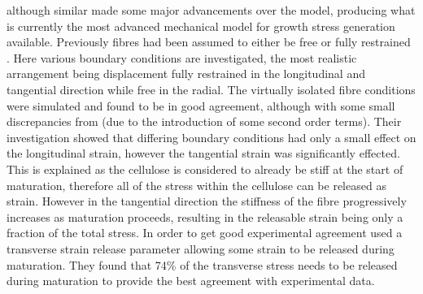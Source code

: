 \citet{Alm_ras_2005}
although similar made some major advancements over the \citet{Yamamoto_1998} model,
producing what is currently the most advanced mechanical model for growth
stress generation available. Previously fibres had been assumed to either be
free \citep{Yamamoto_1998} or fully restrained \citep{archer1987,archer1989}. Here
various boundary conditions are investigated, the most realistic arrangement being
displacement fully restrained in the longitudinal and tangential direction while
free in the radial. The virtually isolated fibre conditions were simulated
and found to be in good agreement, although with some small discrepancies from
\citet{Yamamoto_1998} (due to the introduction of some second order terms).  Their
investigation showed that differing boundary conditions had only a small effect
on the longitudinal strain, however the tangential strain was significantly
effected. This is explained as the cellulose is considered to already be stiff at
the start of maturation, therefore all of the stress within the cellulose can be
released as strain. However in the tangential direction the stiffness of the
fibre progressively increases as maturation proceeds, resulting in the
releasable strain being only a fraction of the total stress. In order to get good
experimental agreement \citet{Alm_ras_2005} used a transverse strain release
parameter allowing some strain to be released during maturation. They
found that 74\% of the transverse stress needs to be released during maturation
to provide the best agreement with experimental data.